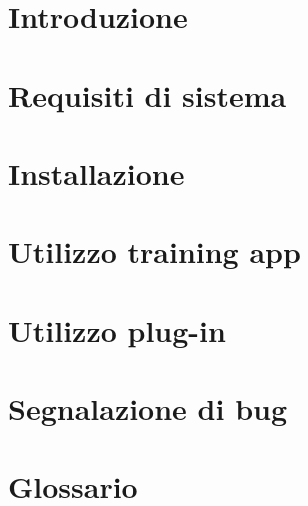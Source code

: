 \documentclass{article}
\begin{document}


\section{Introduzione}%
\label{sec:introduzione}


\newpage

\section{Requisiti di sistema}%
\label{sec:requisiti di sistema}


\newpage

\section{Installazione}%
\label{sec:installazione}


\newpage

\section{Utilizzo training app}%
\label{sec:utilizzo-training-app}


\newpage

\section{Utilizzo plug-in}%
\label{sec:utilizzo-plug-in}


\newpage

\section{Segnalazione di bug}%
\label{sec:segnalazione-di-bug}



\newpage
\appendix
\setcounter{secnumdepth}{1} %
\section{Glossario}%
\label{sec:glossario}

\end{document}
